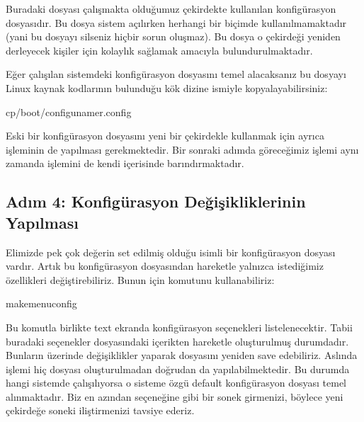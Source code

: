 \documentclass[a4paper,10pt,turkish]{sphinxmanual}
\begin{document}
\sphinxAtStartPar
Buradaki  dosyası çalışmakta olduğumuz çekirdekte kullanılan
konfigürasyon dosyasıdır. Bu dosya sistem açılırken herhangi bir biçimde kullanılmamaktadır (yani bu
dosyayı silseniz hiçbir sorun oluşmaz). Bu dosya o çekirdeği yeniden derleyecek kişiler için
kolaylık sağlamak amacıyla bulundurulmaktadır.

\sphinxAtStartPar
Eğer çalışılan sistemdeki konfigürasyon dosyasını temel alacaksanız bu dosyayı Linux kaynak
kodlarının bulunduğu kök dizine  ismiyle kopyalayabilirsiniz:

\begin{sphinxVerbatim}[commandchars=\\\{\}]
\PYGZdl{}cp/boot/config\PYGZhy{}uname\PYGZhy{}r.config
\end{sphinxVerbatim}

\sphinxAtStartPar
Eski bir konfigürasyon dosyasını yeni bir çekirdekle kullanmak için ayrıca 
işleminin de yapılması gerekmektedir. Bir sonraki adımda göreceğimiz  işlemi
aynı zamanda  işlemini de kendi içerisinde barındırmaktadır.


\subsection{Adım 4: Konfigürasyon Değişikliklerinin Yapılması}
\label{\detokenize{kernelcompilation:adim-4-konfigurasyon-degisikliklerinin-yapilmasi}}
\sphinxAtStartPar
Elimizde pek çok değerin set edilmiş olduğu  isimli bir konfigürasyon dosyası vardır.
Artık bu konfigürasyon dosyasından hareketle yalnızca istediğimiz özellikleri değiştirebiliriz.
Bunun için  komutunu kullanabiliriz:

\begin{sphinxVerbatim}[commandchars=\\\{\}]
\PYGZdl{}makemenuconfig
\end{sphinxVerbatim}

\sphinxAtStartPar
Bu komutla birlikte text ekranda konfigürasyon seçenekleri listelenecektir. Tabii buradaki seçenekler
 dosyasındaki içerikten hareketle oluşturulmuş durumdadır. Bunların üzerinde değişiklikler
yaparak  dosyasını yeniden save edebiliriz. Aslında  işlemi hiç
 dosyası oluşturulmadan doğrudan da yapılabilmektedir. Bu durumda hangi sistemde
çalışılıyorsa o sisteme özgü default konfigürasyon dosyası temel alınmaktadır. Biz en azından
 seçeneğine  gibi bir sonek
girmenizi, böylece yeni çekirdeğe  soneki iliştirmenizi tavsiye ederiz.
\end{document}
